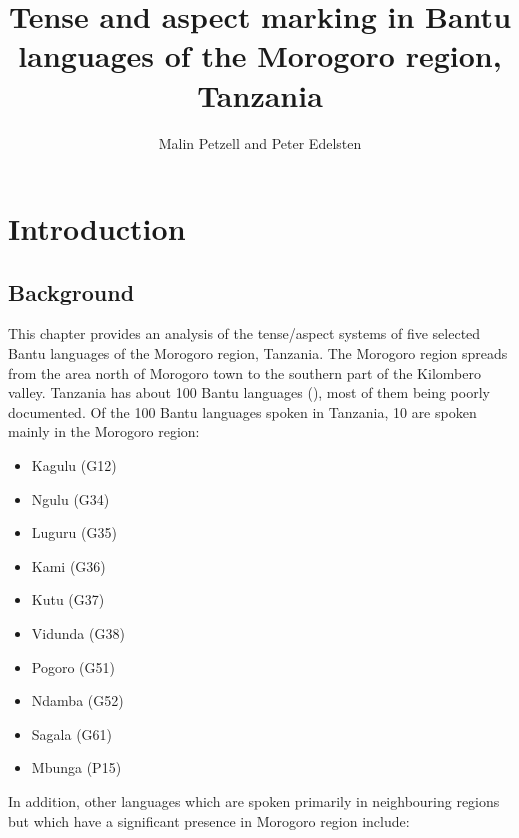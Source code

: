 \documentclass[output=paper,
            colorlinks, citecolor=brown
            ,draftmode
		  ]{langscibook}
\author{Malin Petzell\orcid{0000-0002-0774-5131  }\affiliation{University of Gothenburg} and
        Peter Edelsten\orcid{}\affiliation{SOAS University of London}}
\title[Tense and aspect marking in Bantu languages of Morogoro]
      {Tense and aspect marking in Bantu languages of the Morogoro region, Tanzania}
\begin{document}
\maketitle 



\section{Introduction}\label{sec:petzell:1}
\subsection{Background}\label{sec:petzell:1.1}

This chapter provides an analysis of the tense/aspect systems of five selected Bantu languages of the Morogoro region, Tanzania. The Morogoro region spreads from the area north of Morogoro town to the southern part of the Kilombero valley. Tanzania has about 100 Bantu languages (\citealt{MahoSands2002}), most of them being poorly documented. Of the 100 Bantu languages spoken in Tanzania, 10 are spoken mainly in the Morogoro region:
\newpage

\begin{itemize}
\item 
Kagulu (G12)

\item 
Ngulu (G34)

\item 
Luguru (G35)

\item 
Kami (G36)

\item 
Kutu (G37)

\item 
Vidunda (G38)

\item 
Pogoro (G51)

\item 
Ndamba (G52)

\item 
Sagala (G61)

\item 
Mbunga (P15)

\end{itemize}

In addition, other languages which are spoken primarily in neighbouring regions but which have a significant presence in Morogoro region include:
\end{document}
